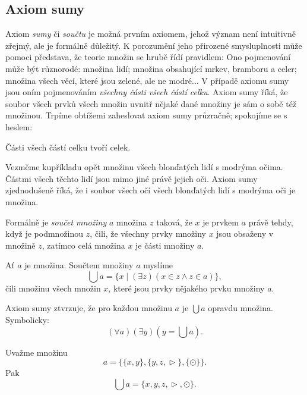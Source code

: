 \subsection{Axiom sumy}
\label{ssec:axiom-sumy}

Axiom \emph{sumy} či \emph{součtu} je možná prvním axiomem, jehož význam není
intuitivně zřejmý, ale je formálně důležitý. K porozumění jeho přirozené
smysluplnosti může pomoci představa, že teorie množin se hrubě řídí pravidlem:
 Ono pojmenování může
být různorodé: množina lidí; množina obsahující mrkev, bramboru a celer; množina
všech věcí, které jsou zelené, ale ne modré... V případě axiomu sumy jsou oním
pojmenováním \emph{všechny části všech částí celku}. Axiom sumy říká, že soubor
všech prvků všech množin uvnitř nějaké dané množiny je sám o sobě též množinou.
Trpíme obtížemi zaheslovat axiom sumy průzračně; spokojíme se s heslem:
\begin{highlightBox}
  \alert{Části všech částí celku tvoří celek.}
\end{highlightBox}

Vezměme kupříkladu opět množinu všech blonďatých lidí s modrýma očima. Částmi
všech těchto lidí jsou mimo jiné právě jejich oči. Axiom sumy zjednodušeně říká,
že i soubor všech očí všech blonďatých lidí s modrýma oči je množina.

Formálně je \emph{součet množiny} $a$ množina $z$ taková, že $x$ je prvkem
$a$ právě tehdy, když je podmnožinou $z$, čili, že všechny prvky množiny $x$
jsou obsaženy v množině $z$, zatímco celá množina $x$ je části množiny $a$.

\begin{definition}
  \label{def:soucet-mnoziny}
  Ať $a$ je množina. Součtem množiny $a$ myslíme
  \[
    \bigcup a = \{x \mid ( \exists z)(x \in z \wedge z \in a)\},
  \]
  čili množinu všech množin $x$, které jsou prvky nějakého prvku množiny $a$.
\end{definition}

Axiom sumy ztvrzuje, že pro každou množinu $a$ je $\bigcup a$ opravdu množina.
Symbolicky:
\begin{equation}
  \label{eq:axiom-sumy}
  (\forall a)(\exists y)(y = \bigcup a).
\end{equation}

\begin{example}
  \label{exam:axiom-sumy}
  Uvažme množinu
  \[
    a = \{\{x, y\}, \{y, z, \vartriangleright\}, \{\odot\}\}.
  \]
  Pak
  \[
    \bigcup a = \{x, y, z, \vartriangleright, \odot\}.
  \]
\end{example}

